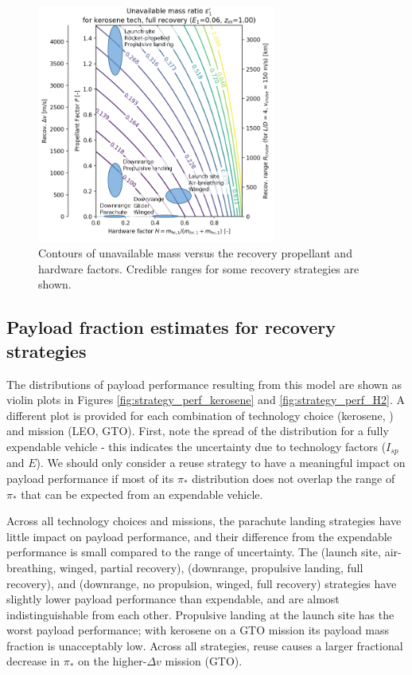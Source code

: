 \documentclass[conf]{new-aiaa}
\begin{document}
\begin{figure}[hbt!]
    \centering
    \includegraphics[width=0.7\textwidth]{unavail_mass_contours_annotated}
    \caption{\label{fig:unavail_mass_contours} Contours of unavailable mass versus the recovery propellant and hardware factors. Credible ranges for some recovery strategies are shown.}
\end{figure}


\subsection{Payload fraction estimates for recovery strategies}
The distributions of payload performance resulting from this model are shown as violin plots in Figures \ref{fig:strategy_perf_kerosene} and \ref{fig:strategy_perf_H2}. A different plot is provided for each combination of technology choice (kerosene, ) and mission (LEO, GTO). First, note the spread of the distribution for a fully expendable vehicle - this indicates the uncertainty due to technology factors ($I_{sp}$ and $E$). We should only consider a reuse strategy to have a meaningful impact on payload performance if most of its $\pi_*$ distribution does not overlap the range of $\pi_*$ that can be expected from an expendable vehicle.

Across all technology choices and missions, the parachute landing strategies have little impact on payload performance, and their difference from the expendable performance is small compared to the range of uncertainty. The (launch site, air-breathing, winged, partial recovery), (downrange, propulsive landing, full recovery), and (downrange, no propulsion, winged, full recovery)  strategies have slightly lower payload performance than expendable, and are almost indistinguishable from each other.  Propulsive landing at the launch site has the worst payload performance; with kerosene on a GTO mission its payload mass fraction is unacceptably low. Across all strategies, reuse causes a larger fractional decrease in $\pi_*$ on the higher-$\Delta v$ mission (GTO).
\end{document}
